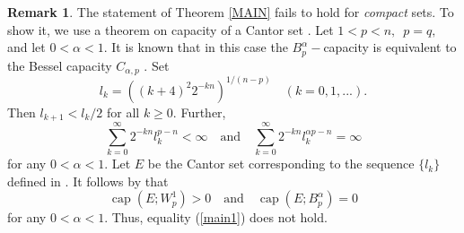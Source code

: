 \documentclass[12pt,twoside,reqno]{amsart}
\numberwithin{equation}{section}
\theoremstyle{definition}
\newtheorem{rem}[teo]{Remark}
\numberwithin{equation}{section}
\begin{document}
\begin{rem}\label{REMARK1} The statement of Theorem \ref{MAIN} fails to hold for {\it
compact}
sets. To show it, we use a theorem on capacity of a Cantor set
\cite[Section 5.3]{AH}. Let $1<p<n, \,\,\,p=q,$ and let $0<{\alpha}<1$. It
is known that in this case the $B_p^{\alpha}-$capacity is equivalent to
the Bessel capacity $C_{{\alpha},p}$ \cite[p. 107]{AH}. Set
$$
l_k=((k+4)^2 2^{-kn})^{1/(n-p)}\quad (k=0,1,...).
$$
Then $l_{k+1}<l_k/2$ for all $k\ge 0.$
Further,
$$
\sum_{k=0}^\infty 2^{-kn}l_k^{p-n}<\infty \quad\mbox{and}\quad \sum_{k=0}^\infty 2^{-kn}l_k^{{\alpha} p-n}=\infty
$$
for any $0<{\alpha}<1.$ Let $E$ be the  Cantor set corresponding to the sequence $\{l_k\}$ defined in
\cite[(5.3.1)]{AH}. It follows by \cite[Theorem 5.3.2]{AH} that
$$
{\operatorname{cap}}(E;W_p^1)>0 \quad\mbox{and}\quad {\operatorname{cap}}(E;B_p^{\alpha})=0
$$
for any $0<{\alpha}<1.$ Thus, equality (\ref{main1}) does not hold.
\end{rem}
\end{document}
